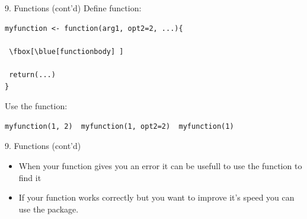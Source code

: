 \documentclass[14pt, aspectratio=169, sectionpage=simple, xclolor=table]{beamer}
\begin{document}
\begin{frame}[fragile, label=ownfunctions]{9. Functions (cont'd)}
Define function:\\
{\small
\begin{Verbatim}[commandchars=\\\[\]]
myfunction <- function(arg1, opt2=2, ...){

 \fbox[\blue[functionbody] ]

 return(...)
}
\end{Verbatim}
}
Use the function:
{\small
\begin{verbatim}
myfunction(1, 2)  myfunction(1, opt2=2)  myfunction(1) 
\end{verbatim}
}
\end{frame}


\begin{frame}{9. Functions (cont'd)}
\begin{itemize}
  \item When your function gives you an error it can be usefull to use the  function to find it
  \item If your function works correctly but you want to improve it's speed you can use the  package.
\end{itemize}
\end{frame}
\end{document}
